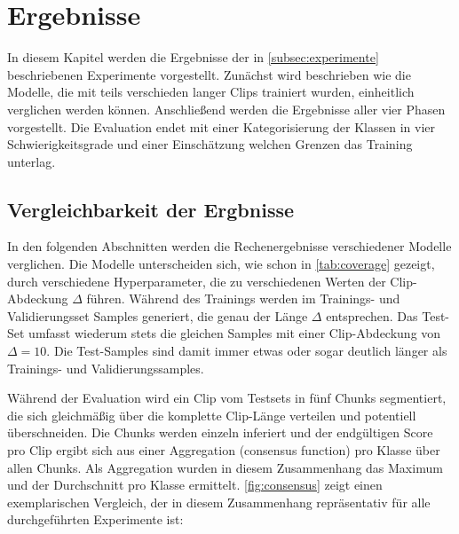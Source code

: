 \chapter{Ergebnisse}
\label{ch:results}

In diesem Kapitel werden die Ergebnisse der in \autoref{subsec:experimente} beschriebenen Experimente vorgestellt.
Zunächst wird beschrieben wie die Modelle, die mit teils verschieden langer Clips trainiert wurden, einheitlich verglichen werden können.
Anschließend werden die Ergebnisse aller vier Phasen vorgestellt.
Die Evaluation endet mit einer Kategorisierung der Klassen in vier Schwierigkeitsgrade und einer Einschätzung welchen Grenzen das Training unterlag.

\section{Vergleichbarkeit der Ergbnisse}

In den folgenden Abschnitten werden die Rechenergebnisse verschiedener Modelle verglichen.
Die Modelle unterscheiden sich, wie schon in \autoref{tab:coverage} gezeigt, durch verschiedene Hyperparameter, die zu verschiedenen Werten der Clip-Abdeckung $\Delta$ führen.
Während des Trainings werden im Trainings- und Validierungsset Samples generiert, die genau der Länge $\Delta$ entsprechen.
Das Test-Set umfasst wiederum stets die gleichen Samples mit einer Clip-Abdeckung von $\Delta=10$.
Die Test-Samples sind damit immer etwas oder sogar deutlich länger als Trainings- und Validierungssamples.

Während der Evaluation wird ein Clip vom Testsets in fünf Chunks segmentiert, die sich gleichmäßig über die komplette Clip-Länge verteilen und potentiell überschneiden.
Die Chunks werden einzeln inferiert und der endgültigen Score pro Clip ergibt sich aus einer Aggregation (consensus function) pro Klasse über allen Chunks.
Als Aggregation wurden in diesem Zusammenhang das Maximum und der Durchschnitt pro Klasse ermittelt.
\autoref{fig:consensus} zeigt einen exemplarischen Vergleich, der in diesem Zusammenhang repräsentativ für alle durchgeführten Experimente ist:

